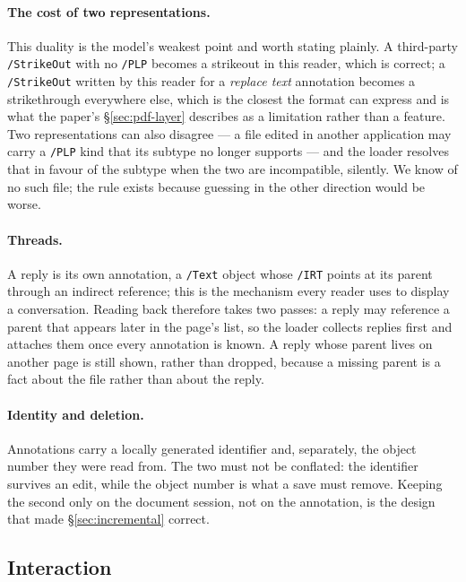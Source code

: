 \paragraph{The cost of two representations.} This duality is the model's weakest point and
worth stating plainly. A third-party \texttt{/StrikeOut} with no \texttt{/PLP} becomes a
strikeout in this reader, which is correct; a \texttt{/StrikeOut} written by this reader for a
\emph{replace text} annotation becomes a strikethrough everywhere else, which is the closest
the format can express and is what the paper's \S\ref{sec:pdf-layer} describes as a
limitation rather than a feature. Two representations can also disagree --- a file edited in
another application may carry a \texttt{/PLP} kind that its subtype no longer supports --- and
the loader resolves that in favour of the subtype when the two are incompatible, silently. We
know of no such file; the rule exists because guessing in the other direction would be worse.

\paragraph{Threads.} A reply is its own annotation, a \texttt{/Text} object whose \texttt{/IRT}
points at its parent through an indirect reference; this is the mechanism every reader uses
to display a conversation. Reading back therefore takes two passes: a reply may reference a
parent that appears later in the page's list, so the loader collects replies first and attaches
them once every annotation is known. A reply whose parent lives on another page is still
shown, rather than dropped, because a missing parent is a fact about the file rather than
about the reply.

\paragraph{Identity and deletion.} Annotations carry a locally generated identifier and,
separately, the object number they were read from. The two must not be conflated: the
identifier survives an edit, while the object number is what a save must remove. Keeping the
second only on the document session, not on the annotation, is the design that made
\S\ref{sec:incremental} correct.

\subsection{Interaction}

